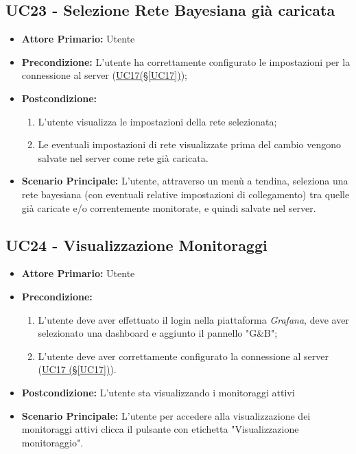 \pagebreak

\subsection{UC23 - Selezione Rete Bayesiana già caricata}\label{UC23}
\begin{itemize}
	\item \textbf{Attore Primario:}  Utente
	\item \textbf{Precondizione:} L'utente ha correttamente configurato le impostazioni per la connessione al server (\hyperref[UC17]{UC17(§\ref*{UC17})});
	\item \textbf{Postcondizione:}
	\begin{enumerate}
		\item L'utente visualizza le impostazioni della rete selezionata;
		\item Le eventuali impostazioni di rete visualizzate prima del cambio vengono salvate nel server come rete già caricata.
	\end{enumerate}
	\item \textbf{Scenario Principale:} L'utente, attraverso un menù a tendina, seleziona una rete bayesiana (con eventuali relative impostazioni di collegamento) tra quelle già caricate e/o correntemente monitorate, e quindi salvate nel server.
\end{itemize}

\pagebreak

\subsection{UC24 - Visualizzazione Monitoraggi}\label{UC24}
\begin{itemize}
	\item \textbf{Attore Primario:}  Utente
	\item \textbf{Precondizione:} 
	\begin{enumerate}
		\item L'utente deve aver effettuato il login nella piattaforma \textit{Grafana}, deve aver selezionato una dashboard e aggiunto il pannello "G\&B";
		\item L'utente deve aver correttamente configurato la connessione al server (\hyperref[UC17]{UC17 (§\ref*{UC17})}).
	\end{enumerate}
	\item \textbf{Postcondizione:} L'utente sta visualizzando i monitoraggi attivi
	\item \textbf{Scenario Principale:} L'utente per accedere alla visualizzazione dei monitoraggi attivi clicca il pulsante con etichetta "Visualizzazione monitoraggio".
\end{itemize}

